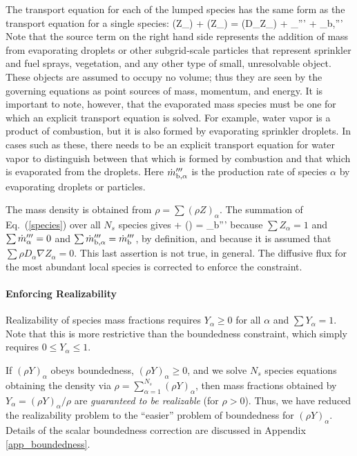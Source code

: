 The transport equation for each of the lumped species has the same form as the transport equation for a single species:
\be {}(\rho Z_\alpha) + \nabla\!\cdot (\rho Z_\alpha \bu) = \nabla\!\cdot (\rho D_\alpha \nabla Z_\alpha) + \dm_\alpha''' + \dm_{\rm b,\alpha}''' \label{species} \ee
Note that the source term on the right hand side represents the addition of mass from evaporating droplets or other subgrid-scale
particles that represent sprinkler and fuel sprays, vegetation, and any other type of small, unresolvable object. These
objects are assumed to occupy no volume; thus they are seen by the governing equations as point sources of mass, momentum, and energy. It is important to
note, however, that the evaporated mass species must be one for which an explicit transport equation is solved. For example, water vapor is a product of
combustion, but it is also formed by evaporating sprinkler droplets. In cases such as these, there needs to be an explicit transport equation for water
vapor to distinguish between that which is formed by combustion and that which is evaporated from the droplets. Here $\dot{m}_{\rm b,\alpha}'''$ is the production rate of species $\alpha$ by evaporating droplets or particles.

The mass density is obtained from $\rho = \sum (\rho Z)_\alpha$.  The summation of Eq.~(\ref{species}) over all $N_s$ species gives
\be {} + \nabla\!\cdot (\rho \bu)  =  \dm_{\rm b}'''  \label{mass} \ee
because $\sum Z_\alpha=1$ and $\sum \dot{m}_\alpha''' = 0$ and $\sum \dot{m}_{\rm b,\alpha}'''=\dot{m}_{\rm b}'''$, by definition, and because it is assumed that $\sum \rho D_\alpha \nabla Z_\alpha = 0$. This last assertion is not true, in general.  The diffusive flux for the most abundant local species is corrected to enforce the constraint.




\paragraph{Enforcing Realizability}

Realizability of species mass fractions requires $Y_\alpha \ge 0$ for all $\alpha$ and $\sum Y_\alpha = 1$.  Note that this is more restrictive than the boundedness constraint, which simply requires $0 \le Y_\alpha \le 1$.

If $(\rho Y)_\alpha$ obeys boundedness, $(\rho Y)_\alpha \ge 0$, and we solve $N_s$ species equations obtaining the density via $\rho = \sum_{\alpha=1}^{N_s} (\rho Y)_\alpha$, then mass fractions obtained by $Y_\alpha = (\rho Y)_\alpha/\rho$ are \emph{guaranteed to be realizable} (for $\rho>0$).  Thus, we have reduced the realizability problem to the ``easier'' problem of boundedness for $(\rho Y)_\alpha$. Details of the scalar boundedness correction are discussed in Appendix \ref{app_boundedness}.

